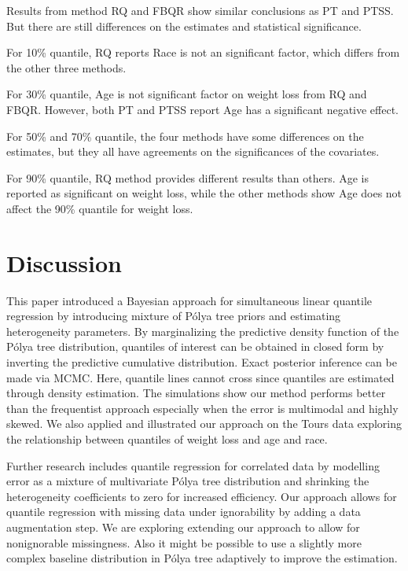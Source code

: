 \documentclass[12pt]{article}
\newcommand{\polya}{P\'{o}lya}
\begin{document}
Results from method RQ and FBQR show similar conclusions as PT and
PTSS.  But there are still differences on the estimates and
statistical significance.

For 10\% quantile, RQ reports Race is not an significant factor, which
differs from the other three methods.

For 30\% quantile, Age is not significant factor on weight loss from
RQ and FBQR. However, both PT and PTSS report Age has a significant
negative effect.

For 50\% and 70\% quantile, the four methods have some differences on
the estimates, but they all have agreements on the significances of
the covariates.

For 90\% quantile, RQ method provides different results than
others. Age is reported as significant on weight loss, while the other
methods show Age does not affect the 90\% quantile for weight loss.

\section{Discussion}
\label{sec:discussion}
This paper introduced a Bayesian approach for simultaneous linear
quantile regression by introducing mixture of \polya{} tree priors and
estimating heterogeneity parameters. By marginalizing the predictive
density function of the \polya{} tree distribution, quantiles of
interest can be obtained in closed form by inverting the predictive
cumulative distribution. Exact posterior inference can be made via
MCMC. Here, quantile lines cannot cross since quantiles are estimated
through density estimation. The simulations show our method performs
better than the frequentist approach especially when the error is
multimodal and highly skewed.  We also applied and illustrated our
approach on the Tours data exploring the relationship between
quantiles of weight loss and age and race.

Further research includes quantile regression for correlated data by
modelling error as a mixture of multivariate \polya{} tree
distribution and shrinking the heterogeneity coefficients to zero for
increased efficiency.  Our approach allows for quantile regression
with missing data under ignorability by adding a data augmentation
step.  We are exploring extending our approach to allow for
nonignorable missingness. Also it might be possible to use a slightly
more complex baseline distribution in \polya{} tree adaptively to
improve the estimation.


 
\end{document}

